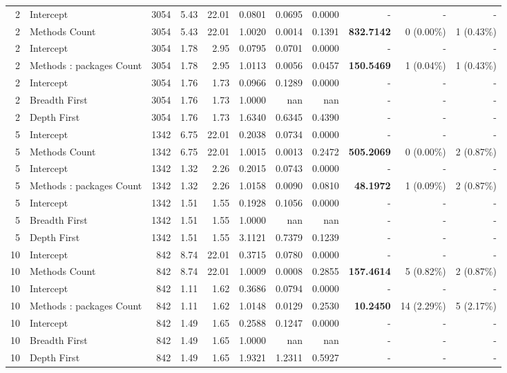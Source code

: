 \begin{landscape}
\begin{table}[H]
\begin{tabular}{r l r r r r r r r r r}
2 & Intercept & 3054 & 5.43 & 22.01 & 0.0801 & 0.0695 & 0.0000 & - & - & - \\ 
2 & Methods Count & 3054 & 5.43 & 22.01 & 1.0020 & 0.0014 & 0.1391 & \textbf{832.7142} & 0 (0.00\%) & 1 (0.43\%) \\ 
2 & Intercept & 3054 & 1.78 & 2.95 & 0.0795 & 0.0701 & 0.0000 & - & - & - \\ 
2 & Methods : packages Count & 3054 & 1.78 & 2.95 & 1.0113 & 0.0056 & 0.0457 & \textbf{150.5469} & 1 (0.04\%) & 1 (0.43\%) \\ 
2 & Intercept & 3054 & 1.76 & 1.73 & 0.0966 & 0.1289 & 0.0000 & - & - & - \\ 
2 & Breadth First & 3054 & 1.76 & 1.73 & 1.0000 & nan & nan & - & - & - \\ 
2 & Depth First & 3054 & 1.76 & 1.73 & 1.6340 & 0.6345 & 0.4390 & - & - & - \\ 
5 & Intercept & 1342 & 6.75 & 22.01 & 0.2038 & 0.0734 & 0.0000 & - & - & - \\ 
5 & Methods Count & 1342 & 6.75 & 22.01 & 1.0015 & 0.0013 & 0.2472 & \textbf{505.2069} & 0 (0.00\%) & 2 (0.87\%) \\ 
5 & Intercept & 1342 & 1.32 & 2.26 & 0.2015 & 0.0743 & 0.0000 & - & - & - \\ 
5 & Methods : packages Count & 1342 & 1.32 & 2.26 & 1.0158 & 0.0090 & 0.0810 & \textbf{48.1972} & 1 (0.09\%) & 2 (0.87\%) \\ 
5 & Intercept & 1342 & 1.51 & 1.55 & 0.1928 & 0.1056 & 0.0000 & - & - & - \\ 
5 & Breadth First & 1342 & 1.51 & 1.55 & 1.0000 & nan & nan & - & - & - \\ 
5 & Depth First & 1342 & 1.51 & 1.55 & 3.1121 & 0.7379 & 0.1239 & - & - & - \\ 
10 & Intercept & 842 & 8.74 & 22.01 & 0.3715 & 0.0780 & 0.0000 & - & - & - \\ 
10 & Methods Count & 842 & 8.74 & 22.01 & 1.0009 & 0.0008 & 0.2855 & \textbf{157.4614} & 5 (0.82\%) & 2 (0.87\%) \\ 
10 & Intercept & 842 & 1.11 & 1.62 & 0.3686 & 0.0794 & 0.0000 & - & - & - \\ 
10 & Methods : packages Count & 842 & 1.11 & 1.62 & 1.0148 & 0.0129 & 0.2530 & \textbf{10.2450} & 14 (2.29\%) & 5 (2.17\%) \\ 
10 & Intercept & 842 & 1.49 & 1.65 & 0.2588 & 0.1247 & 0.0000 & - & - & - \\ 
10 & Breadth First & 842 & 1.49 & 1.65 & 1.0000 & nan & nan & - & - & - \\ 
10 & Depth First & 842 & 1.49 & 1.65 & 1.9321 & 1.2311 & 0.5927 & - & - & - \\ 
\end{tabular}%
\label{tab:codebase_graph_latex_repository_graph_component_time_series_strategy_logistic_regressionSustained_True_methods_20} 
\end{table}
\end{landscape}
\newpage 

 \newpage 
